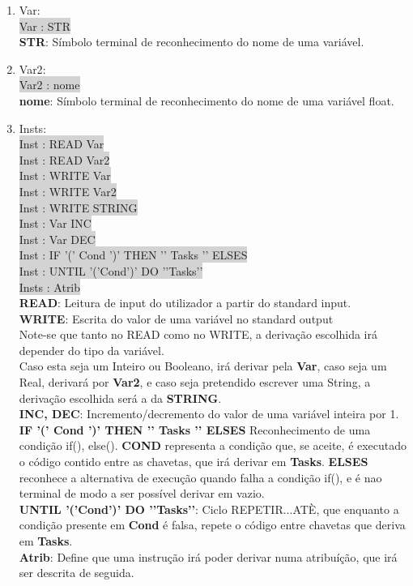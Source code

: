 \documentclass{report}
\begin{document}
\begin{enumerate}
\item{Var}:\\
\colorbox{lightgray}{Var : STR}\\
\textbf{STR}: Símbolo terminal de reconhecimento do nome de uma variável.

\item{Var2}:\\
\colorbox{lightgray}{Var2 : nome}\\
\textbf{nome}: Símbolo terminal de reconhecimento do nome de uma variável float.

\item{Insts}:\\
\colorbox{lightgray}{Inst : READ Var}\\
\colorbox{lightgray}{Inst : READ Var2}\\
\colorbox{lightgray}{Inst : WRITE Var}\\
\colorbox{lightgray}{Inst : WRITE Var2}\\
\colorbox{lightgray}{Inst : WRITE STRING}\\
\colorbox{lightgray}{Inst : Var INC}\\
\colorbox{lightgray}{Inst : Var DEC}\\
\colorbox{lightgray}{Inst : IF '(' Cond ')' THEN '{' Tasks '}' ELSES}\\
\colorbox{lightgray}{Inst : UNTIL '('Cond')' DO '{'Tasks'}'}\\
\colorbox{lightgray}{Insts : Atrib}\\
\textbf{READ}: Leitura de input do utilizador a partir do standard input.\\
\textbf{WRITE}: Escrita do valor de uma variável no standard output\\
Note-se que tanto no READ como no WRITE, a derivação escolhida irá depender do tipo da variável.\\
Caso esta seja um Inteiro ou Booleano, irá derivar pela \textbf{Var}, caso seja um Real, derivará por \textbf{Var2}, e caso seja pretendido escrever uma String, a derivação escolhida será a da \textbf{STRING}.\\
\textbf{INC, DEC}: Incremento/decremento do valor de uma variável inteira por 1.\\
\textbf{IF '(' Cond ')' THEN '{' Tasks '}' ELSES} Reconhecimento de uma condição if(), else(). \textbf{COND} representa a condição que, se aceite, é executado o código contido entre as chavetas, que irá derivar em \textbf{Tasks}. \textbf{ELSES} reconhece a alternativa de execução quando falha a condição if(), e é nao terminal de modo a ser possível derivar em vazio.\\
\textbf{UNTIL '('Cond')' DO '{'Tasks'}'}: Ciclo REPETIR...ATÈ, que enquanto a condição presente em \textbf{Cond} é falsa, repete o código entre chavetas que deriva em \textbf{Tasks}.\\
\textbf{Atrib}: Define que uma instrução irá poder derivar numa atribuíção, que irá ser descrita de seguida.


\end{enumerate}
\end{document}
